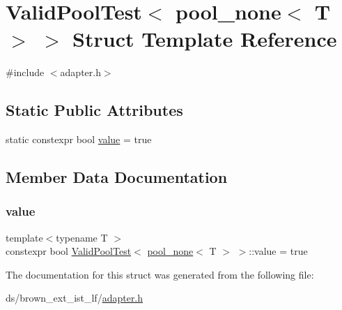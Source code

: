 \hypertarget{structValidPoolTest_3_01pool__none_3_01T_01_4_01_4}{}\section{Valid\+Pool\+Test$<$ pool\+\_\+none$<$ T $>$ $>$ Struct Template Reference}
\label{structValidPoolTest_3_01pool__none_3_01T_01_4_01_4}


{\ttfamily \#include $<$adapter.\+h$>$}

\subsection*{Static Public Attributes}
\begin{DoxyCompactItemize}
\item 
static constexpr bool \hyperlink{structValidPoolTest_3_01pool__none_3_01T_01_4_01_4_ad9d39280e11018be46ffad11381ab80e}{value} = true
\end{DoxyCompactItemize}


\subsection{Member Data Documentation}
\mbox{\label{structValidPoolTest_3_01pool__none_3_01T_01_4_01_4_ad9d39280e11018be46ffad11381ab80e}} 
\subsubsection{\texorpdfstring{value}{value}}
{\footnotesize\ttfamily template$<$typename T $>$ \\
constexpr bool \hyperlink{structValidPoolTest}{Valid\+Pool\+Test}$<$ \hyperlink{classpool__none}{pool\+\_\+none}$<$ T $>$ $>$\+::value = true\hspace{0.3cm}{\ttfamily [static]}}



The documentation for this struct was generated from the following file\+:\begin{DoxyCompactItemize}
\item 
ds/brown\+\_\+ext\+\_\+ist\+\_\+lf/\hyperlink{brown__ext__ist__lf_2adapter_8h}{adapter.\+h}\end{DoxyCompactItemize}
